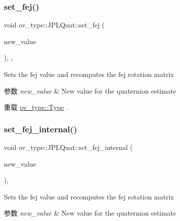 \subsubsection{\texorpdfstring{set\+\_\+fej()}{set\_fej()}}
{\footnotesize\ttfamily void ov\+\_\+type\+::\+J\+P\+L\+Quat\+::set\+\_\+fej (\begin{DoxyParamCaption}\item[{const Eigen\+::\+Matrix\+Xd \&}]{new\+\_\+value }\end{DoxyParamCaption})\hspace{0.3cm}{\ttfamily [inline]}, {\ttfamily [override]}, {\ttfamily [virtual]}}



Sets the fej value and recomputes the fej rotation matrix 


\begin{DoxyParams}{参数}
{\em new\+\_\+value} & New value for the quaternion estimate \\
\hline
\end{DoxyParams}


重载 \hyperlink{classov__type_1_1Type_ab8345946b27cb43e0cfc36454a06686d}{ov\+\_\+type\+::\+Type} .

\mbox{\label{classov__type_1_1JPLQuat_ac1e67273e4414bc4a162787ff6d73a48}} 
\subsubsection{\texorpdfstring{set\+\_\+fej\+\_\+internal()}{set\_fej\_internal()}}
{\footnotesize\ttfamily void ov\+\_\+type\+::\+J\+P\+L\+Quat\+::set\+\_\+fej\+\_\+internal (\begin{DoxyParamCaption}\item[{const Eigen\+::\+Matrix\+Xd \&}]{new\+\_\+value }\end{DoxyParamCaption})\hspace{0.3cm}{\ttfamily [inline]}, {\ttfamily [protected]}}



Sets the fej value and recomputes the fej rotation matrix 


\begin{DoxyParams}{参数}
{\em new\+\_\+value} & New value for the quaternion estimate \\
\hline
\end{DoxyParams}
\mbox{\label{classov__type_1_1JPLQuat_a51847b09cfc48c3d869d08ecd7f4821d}} 

